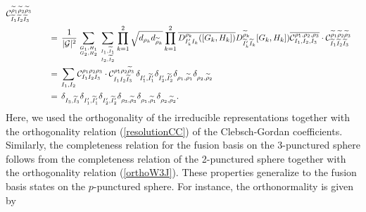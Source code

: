 \documentclass[nofootinbib,superscriptaddress,eqsecnum,tightenlines,11pt]{revtex4-1}
\def\nn{\nonumber}
\def\q{\qquad}
\renewcommand{\tilde}{\widetilde}
\begin{document}
\begin{align}
	{\mathcal{C}^{\widetilde{\rho}_1\widetilde{\rho}_2\widetilde{\rho}_{3}}_{\tilde{I}_1\tilde{I}_2\tilde{I}_3}}\\ \nn
	&\q = \, \frac{1}{|\mathcal{G}|^{2}}
	\sum_{{G_1,H_1 \atop G_2,H_2}}
	\sum_{{I_1,\tilde{I}_1 \atop I_2,\tilde{I}_2}} \prod_{k=1}^2\sqrt{d_{\rho_k}d_{\widetilde{\rho}_k}}
	\prod_{k=1}^2 \overline{D^{\rho_k}_{I_k'I_k}([G_k,H_k])}D^{\widetilde{\rho}_k}_{\tilde{I}_k'\tilde{I}_k}[{G}_k,{H}_k])
	 \overline{\mathcal{C}^{\rho_1,\rho_2,\rho_{3}}_{I_1,I_2,I_3}}\cdot 
	\mathcal{C}^{\widetilde{\rho}_1\widetilde{\rho}_2\widetilde{\rho}_{3}}_{\tilde{I}_1\tilde{I}_2\tilde{I}_3}\\ \nn
	& \q = \, \sum_{I_1,I_2}  \mathcal{C}^{\rho_1\rho_2\rho_{3}}_{I_1I_2I_3}\cdot \mathcal{C}^{\rho_1\rho_2\widetilde{\rho}_{3}}_{I_1I_2\tilde{I}_3}
	\, \delta_{I_1',\tilde{I}_1'}\delta_{I_2',\tilde{I}_2'}\delta_{\rho_1,\widetilde{\rho}_1}\delta_{\rho_2,\widetilde{\rho}_2}\\
	&\q = \, \delta_{I_3,\tilde{I}_3}\delta_{I_1',\tilde{I}_1'}\delta_{I_2',\tilde{I}_2'}\delta_{\rho_3,\widetilde{\rho}_3}\delta_{\rho_1,\widetilde{\rho}_1}\delta_{\rho_2,\widetilde{\rho}_2}.
\end{align} 
Here, we used the orthogonality of the irreducible representations together with the orthogonality relation (\ref{resolutionCC}) of the Clebsch-Gordan coefficients.
Similarly, the completeness relation for the fusion basis on the 3-punctured sphere follows from the completeness relation of the 2-punctured sphere together with the orthogonality relation (\ref{orthoW3J}). These properties generalize to the fusion basis states on the $p$-punctured sphere. For instance, the orthonormality is given by
\newpage
\end{document}
